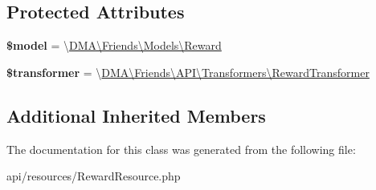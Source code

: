 \subsection*{Protected Attributes}
\begin{DoxyCompactItemize}
\item 
\hypertarget{classDMA_1_1Friends_1_1API_1_1Resources_1_1RewardResource_a85d20b82f07c9523aecf7bcc357549d1}{}{\bfseries \$model} = \textquotesingle{}\textbackslash{}\hyperlink{classDMA_1_1Friends_1_1Models_1_1Reward}{D\+M\+A\textbackslash{}\+Friends\textbackslash{}\+Models\textbackslash{}\+Reward}\textquotesingle{}\label{classDMA_1_1Friends_1_1API_1_1Resources_1_1RewardResource_a85d20b82f07c9523aecf7bcc357549d1}

\item 
\hypertarget{classDMA_1_1Friends_1_1API_1_1Resources_1_1RewardResource_ac8acd84863c51e75de4f855c0590a767}{}{\bfseries \$transformer} = \textquotesingle{}\textbackslash{}\hyperlink{classDMA_1_1Friends_1_1API_1_1Transformers_1_1RewardTransformer}{D\+M\+A\textbackslash{}\+Friends\textbackslash{}\+A\+P\+I\textbackslash{}\+Transformers\textbackslash{}\+Reward\+Transformer}\textquotesingle{}\label{classDMA_1_1Friends_1_1API_1_1Resources_1_1RewardResource_ac8acd84863c51e75de4f855c0590a767}

\end{DoxyCompactItemize}
\subsection*{Additional Inherited Members}


The documentation for this class was generated from the following file\+:\begin{DoxyCompactItemize}
\item 
api/resources/Reward\+Resource.\+php\end{DoxyCompactItemize}
